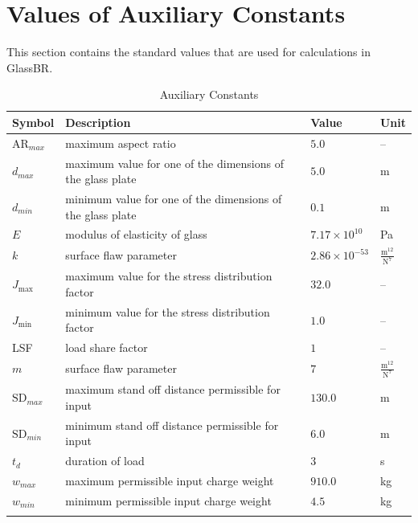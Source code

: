 \documentclass[12pt]{article}
\newcommand{\progname}{GlassBR}
\begin{document}
\section{Values of Auxiliary Constants}


\label{Sec:ValuofAuxiCons}
This section contains the standard values that are used for calculations in
\progname{}.

\begin{longtabu}{l X[l] l l}
\toprule
Symbol & Description & Value & Unit
\\
\midrule
${\text{AR}_{max}}$ & maximum aspect ratio & $5.0$ & --
\\
${d_{max}}$ & maximum value for one of the dimensions of the glass plate & $5.0$ & m
\\
${d_{min}}$ & minimum value for one of the dimensions of the glass plate & $0.1$ & m
\\
$E$ & modulus of elasticity of glass & $7.17\times 10^{10}$ & Pa
\\
$k$ & surface flaw parameter & $2.86\times 10^{-53}$ & $\frac{\text{m}^{12}}{\text{N}^{7}}$
\\
${J_{\text{max}}}$ & maximum value for the stress distribution factor & $32.0$ & --
\\
${J_{\text{min}}}$ & minimum value for the stress distribution factor & $1.0$ & --
\\
LSF & load share factor & $1$ & --
\\
$m$ & surface flaw parameter & $7$ & $\frac{\text{m}^{12}}{\text{N}^{7}}$
\\
${\text{SD}_{max}}$ & maximum stand off distance permissible for input & $130.0$ & m
\\
${\text{SD}_{min}}$ & minimum stand off distance permissible for input & $6.0$ & m
\\
${t_{d}}$ & duration of load & $3$ & s
\\
${w_{max}}$ & maximum permissible input charge weight & $910.0$ & kg
\\
${w_{min}}$ & minimum permissible input charge weight & $4.5$ & kg
\\
\bottomrule
\caption{Auxiliary Constants}
\label{Table:AuxiCons}
\end{longtabu}
\end{document}
